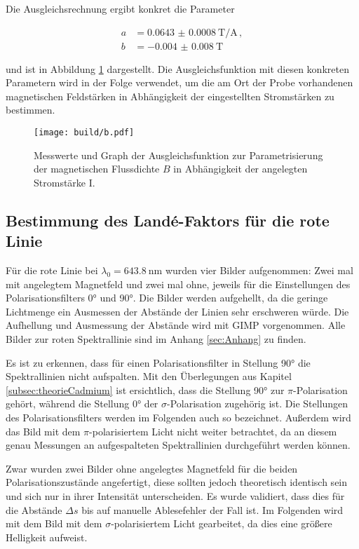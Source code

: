 Die Ausgleichsrechnung ergibt konkret die Parameter

\begin{align}
  a &= \SI{0.0643(8)}{\tesla\per\ampere}\,,\\
  b &= \SI{-0.004(8)}{\tesla}\,
  \label{eqn:paramsB(I)}
\end{align}

und ist in Abbildung \ref{fig:bAusgleich} dargestellt.
Die Ausgleichsfunktion mit diesen konkreten Parametern wird in der Folge verwendet, um
die am Ort der Probe vorhandenen magnetischen Feldstärken in Abhängigkeit der eingestellten Stromstärken zu bestimmen.

\begin{figure}
  \centering
  \texttt{[image: build/b.pdf]}
  \caption{Messwerte und Graph der Ausgleichsfunktion zur Parametrisierung der magnetischen Flussdichte $B$ in Abhängigkeit der angelegten Stromstärke I.}
  \label{fig:bAusgleich}
\end{figure}

\newpage
\subsection{Bestimmung des Landé-Faktors für die rote Linie}

Für die rote Linie bei $\lambda_0=\SI{643.8}{\nano\meter}$ wurden vier Bilder aufgenommen: Zwei mal mit angelegtem Magnetfeld und zwei mal ohne, jeweils für die Einstellungen des Polarisationsfilters \ang{0} und \ang{90}.
Die Bilder werden aufgehellt, da die geringe Lichtmenge ein Ausmessen der Abstände der Linien sehr erschweren würde. Die Aufhellung und Ausmessung der Abstände wird mit GIMP \cite{gimp} vorgenommen.
Alle Bilder zur roten Spektrallinie sind im Anhang \ref{sec:Anhang} zu finden.

Es ist zu erkennen, dass für einen Polarisationsfilter in Stellung \ang{90} die Spektrallinien nicht aufspalten. Mit den Überlegungen aus Kapitel \ref{subsec:theorieCadmium} ist ersichtlich, dass die Stellung \ang{90} zur $\pi$-Polarisation gehört, während die Stellung \ang{0} der $\sigma$-Polarisation zugehörig ist. Die Stellungen des Polarisationsfilters werden im Folgenden auch so bezeichnet. Außerdem wird das Bild mit dem $\pi$-polarisiertem Licht nicht weiter betrachtet, da an diesem genau Messungen an aufgespalteten Spektrallinien durchgeführt werden können.

Zwar wurden zwei Bilder ohne angelegtes Magnetfeld für die beiden Polarisationszustände angefertigt, diese sollten jedoch theoretisch identisch sein und sich nur in ihrer Intensität unterscheiden. Es wurde validiert, dass dies für die Abstände $\Delta s$ bis auf manuelle Ablesefehler der Fall ist.
Im Folgenden wird mit dem Bild mit dem $\sigma$-polarisiertem Licht gearbeitet, da dies eine größere Helligkeit aufweist.

